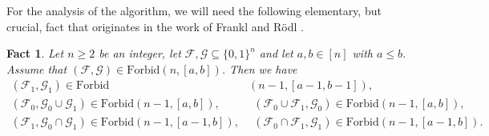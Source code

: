 \documentclass[10pt]{amsart}
\newtheorem{fact}[thm]{Fact}
\theoremstyle{remark}
\newcommand{\meg}{\geqslant}
\newcommand{\mik}{\leqslant}
\newcommand{\Fcal}{\mathcal{F}}
\newcommand{\Gcal}{\mathcal{G}}
\begin{document}
For the analysis of the algorithm, we will need the following elementary, but crucial,
fact that originates in the work of Frankl and R\"{o}dl \cite{FR87}.
\begin{fact} \label{f5.1}
Let $n\meg 2$ be an integer, let $\Fcal,\Gcal\subseteq \{0,1\}^n$ and let $a,b\in [n]$ with $a\mik b$.
Assume that $(\Fcal,\Gcal)\in\mathrm{Forbid}(n,[a,b])$. Then we have
\begin{align}
\label{e5.1}  (\Fcal_1,\Gcal_1) \in  \mathrm{Forbid}&(n-1,[a-1,b-1]), \\
\label{e5.2}  (\Fcal_0,\Gcal_0\cup\Gcal_1)\in \mathrm{Forbid}(n-1,[a,b]), & \ \
(\Fcal_0\cup\Fcal_1,\Gcal_0)\in \mathrm{Forbid}(n-1,[a,b]), \\
\label{e5.3} (\Fcal_1,\Gcal_0\cap\Gcal_1)\in \mathrm{Forbid}(n-1,[a-1,b]), & \ \
(\Fcal_0\cap\Fcal_1,\Gcal_1)\in \mathrm{Forbid}(n-1,[a-1,b]).
\end{align}
\end{fact}
\end{document}
